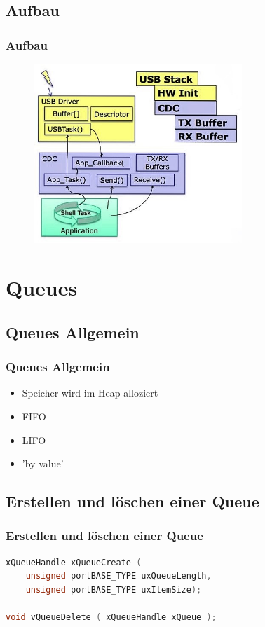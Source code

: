 \documentclass{beamer}
\begin{document}
	\subsection{Aufbau}
	\begin{frame}
		\frametitle{Aufbau}
		\begin{figure}
			\includegraphics[width=0.7\textwidth]{stack}
		\end{figure}		
	\end{frame}


	
	\section{Queues}
	\subsection{Queues Allgemein}
	\begin{frame}
		\frametitle{Queues Allgemein}
		\begin{itemize}
			\item	Speicher wird im Heap alloziert
			\item	FIFO
			\item	LIFO
			\item	'by value'
		\end{itemize}
	\end{frame}

	\subsection{Erstellen und löschen einer Queue}
\begin{frame}[fragile]
\frametitle{Erstellen und löschen einer Queue}
\begin{lstlisting}[language = C]
xQueueHandle xQueueCreate ( 
	unsigned portBASE_TYPE uxQueueLength,
	unsigned portBASE_TYPE uxItemSize);

void vQueueDelete ( xQueueHandle xQueue );	
\end{lstlisting}
\end{frame}
	
\end{document}
